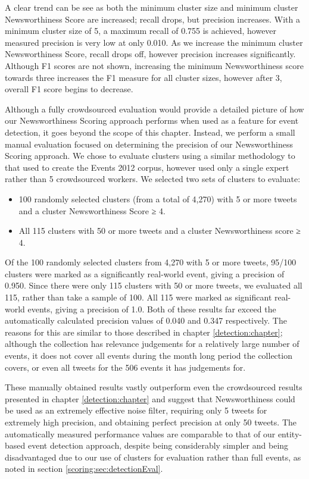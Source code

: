 A clear trend can be see as both the minimum cluster size and minimum cluster Newsworthiness Score are increased; recall drops, but precision increases. With a minimum cluster size of 5, a maximum recall of 0.755 is achieved, however measured precision is very low at only 0.010.
As we increase the minimum cluster Newsworthiness Score, recall drops off, however precision increases significantly.
Although F1 scores are not shown, increasing the minimum Newsworthiness score towards three increases the F1 measure for all cluster sizes, however after 3, overall F1 score begins to decrease.

Although a fully crowdsourced evaluation would provide a detailed picture of how our Newsworthiness Scoring approach performs when used as a feature for event detection, it goes beyond the scope of this chapter.
Instead, we perform a small manual evaluation focused on determining the precision of our Newsworthiness Scoring approach.
We chose to evaluate clusters using a similar methodology to that used to create the Events 2012 corpus, however used only a single expert rather than 5 crowdsourced workers.
We selected two sets of clusters to evaluate:
\begin{itemize}
	\item 100 randomly selected clusters (from a total of 4,270) with 5 or more tweets and a cluster Newsworthiness Score ≥ 4.
	\item All 115 clusters with 50 or more tweets and a cluster Newsworthiness score ≥ 4.
\end{itemize}

Of the 100 randomly selected clusters from 4,270 with 5 or more tweets, 95/100 clusters were marked as a significantly real-world event, giving a precision of 0.950.
Since there were only 115 clusters with 50 or more tweets, we evaluated all 115, rather than take a sample of 100. All 115 were marked as significant real-world events, giving a precision of 1.0.
Both of these results far exceed the automatically calculated precision values of 0.040 and 0.347 respectively.
The reasons for this are similar to those described in chapter \ref{detection:chapter}; although the collection has relevance judgements for a relatively large number of events, it does not cover all events during the month long period the collection covers, or even all tweets for the 506 events it has judgements for.

These manually obtained results vastly outperform even the crowdsourced results presented in chapter \ref{detection:chapter} and suggest that Newsworthiness could be used as an extremely effective noise filter, requiring only 5 tweets for extremely high precision, and obtaining perfect precision at only 50 tweets.
The automatically measured performance values are comparable to that of our entity-based event detection approach, despite being considerably simpler and being disadvantaged due to our use of clusters for evaluation rather than full events, as noted in section \ref{scoring:sec:detectionEval}.